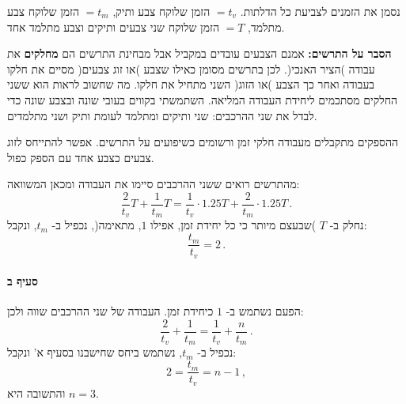 \documentclass[12pt,a4paper]{article}
\begin{document}
נסמן את הזמנים לצביעת כל הדלתות. 
$=t_v$
הזמן שלוקח צבע ותיק,
$=t_m$
הזמן שלוקח צבע מתלמד,
$=T$
הזמן שלוקח שני צבעים ותיקים וצבע מתלמד אחד.

\smallskip

\noindent\textbf{הסבר על התרשים:}
אמנם הצבעים עובדים במקביל אבל מבחינת התרשים הם
\textbf{מחלקים}
את עבודה )הציר האנכי(. לכן בתרשים מסומן כאילו שצבע )או זוג צבעים( מסיים את חלקו בעבודה ואחר כך הצבע )או הזוג( השני מתחיל את חלקו. מה שחשוב לראות הוא ששני החלקים מסתכמים ליחידת העבודה המליאה. השתמשתי בקווים בעובי שונה ובצבע שונה כדי לבדל את שני ההרכבים: שני ותיקים ומתלמד לעומת ותיק ושני מתלמדים.

ההספקים מתקבלים מעבודה חלקי זמן ורשומים כשיפועים על התרשים.  אפשר להתייחס לזוג צבעים כצבע אחד עם הספק כפול.

\smallskip

מהתרשים רואים ששני ההרכבים סיימו את העבודה ומכאן המשוואה:
\[
\frac{2}{t_v}T + \frac{1}{t_m} T = \frac{1}{t_v} \cdot 1.25T + \frac{2}{t_m} \cdot 1.25 T\,.
\]
נחלק ב-
$T$
)שבעצם מיותר כי כל יחידת זמן, אפילו
$1$,
מתאימה(, נכפיל ב-
$t_m$,
ונקבל:
\[
\frac{t_m}{t_v}=2\,.
\]

\paragraph{סעיף ב}

\begin{center}
\end{center}

הפעם נשתמש ב-
$1$
כיחידת זמן. העבודה של שני ההרכבים שווה ולכן:
\[
\frac{2}{t_v} + \frac{1}{t_m} = \frac{1}{t_v} + \frac{n}{t_m}\,.
\]
נכפיל ב-
$t_m$,
נשתמש ביחס שחישבנו בסעיף א' ונקבל:
\[
2=\frac{t_m}{t_v}=n-1\,,
\]
והתשובה היא
$n=3$.
\end{document}
